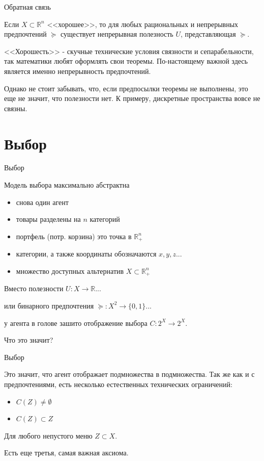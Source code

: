 \documentclass{beamer}
\begin{document}
\begin{frame}{Обратная связь}

\begin{theorem}[Дебрё]
Если $X\subset \mathbb{R}^n$ <<хорошее>>, то для любых рациональных и непрерывных предпочтений $\succcurlyeq$ существует непрерывная полезность $U$, представляющая $\succcurlyeq$.
\end{theorem}

<<Хорошесть>> - скучные технические условия связности и сепарабельности, так математики любят оформлять свои теоремы. По-настоящему важной здесь является именно непрерывность предпочтений.

Однако не стоит забывать, что, если предпосылки теоремы не выполнены, это еще не значит, что полезности нет. К примеру, дискретные пространства вовсе не связны.

\end{frame}

\section{Выбор}

\begin{frame}{Выбор}

Модель выбора максимально абстрактна

\begin{itemize}
\item снова один агент
\item товары разделены на $n$ категорий
\item портфель (потр. корзина) это точка в $\mathbb{R}_{+}^{n}$	
\item категории, а также координаты обозначаются $x, y, z...$
\item множество доступных альтернатив $X \subset \mathbb{R}_{+}^{n}$
\end{itemize}

Вместо полезности $U: X \to \mathbb{R}$...

или бинарного предпочтения $\succcurlyeq: X^2 \to \{0,1\}$...

у агента в голове зашито \alert{отображение выбора} $C: 2^X \to 2^X$. 

Что это значит?

\end{frame}

\begin{frame}{Выбор}

Это значит, что агент отображает подмножества в подмножества. Так же как и с предпочтениями, есть несколько естественных технических ограничений:

\begin{itemize}
  \item $C(Z) \neq \emptyset$
  \item $C(Z) \subset Z$
\end{itemize}

Для любого непустого меню $Z \subset X$. 

Есть еще третья, самая важная аксиома.

\end{frame}
\end{document}
